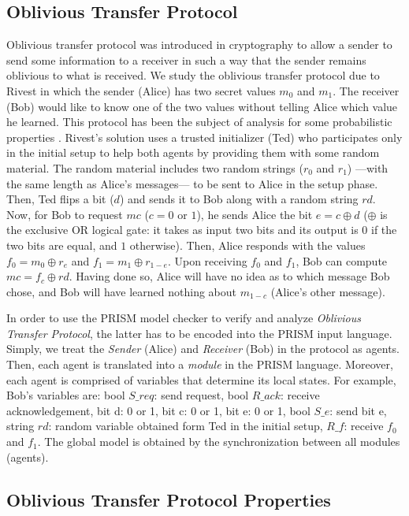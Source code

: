 \subsection{Oblivious Transfer Protocol}
Oblivious transfer protocol was introduced in cryptography to
allow a sender to send some information to a receiver
in such a way that the sender remains oblivious to what is
received. We study the oblivious transfer protocol due to Rivest \cite{Rivest1999} in which the sender (Alice) has
two secret values $m_0$ and $m_1$. The receiver (Bob) would like
to know one of the two values without telling Alice which value he
learned. This protocol has been the subject of analysis for some
probabilistic properties \cite{Huang2011}. Rivest's solution uses
a trusted initializer (Ted) who participates only in the initial
setup to help both agents by providing them with some
random material. The random material includes two random strings ($r_0$ and $r_1$) ---with the same length as Alice's messages--- to be sent to Alice
in the setup phase. Then, Ted flips a bit ($d$) and sends it to
Bob along with a random string $rd$. Now, for Bob to request
$mc$ ($c=0$ or $1$), he sends Alice the bit $e=c\oplus d$
($\oplus$ is the exclusive OR logical gate: it takes as input two
bits and its output is $0$ if the two bits are equal, and $1$
otherwise). Then, Alice responds with the values $f_0=m_0\oplus
r_e$ and $f_1=m_1\oplus r_{1-e}$. Upon receiving $f_0$ and $f_1$,
Bob can compute $mc=f_c\oplus rd$. Having done so, Alice will
have no idea as to which message Bob chose, and Bob will have
learned nothing about $m_{1-c}$ (Alice's other message).

In order to use the PRISM model checker to verify and analyze
\emph{Oblivious Transfer Protocol}, the latter has to be encoded
into the PRISM input language. Simply, we treat the \emph{Sender}
(Alice) and \emph{Receiver} (Bob) in the protocol as agents. Then,
each agent is translated into a \emph{module} in the PRISM
language. Moreover, each agent is comprised of variables that
determine its local states. For example, Bob's variables are: bool
$S\_req$: send request, bool $R\_ack$: receive acknowledgement,
bit d: 0 or 1, bit c: 0 or 1, bit e: 0 or 1, bool $S\_e$: send bit
e, string $rd$: random variable obtained form Ted in the initial
setup, $R\_f$: receive $f_0$ and $f_1$. The global model is
obtained by the synchronization between all modules (agents).


\subsection{Oblivious Transfer Protocol Properties}

